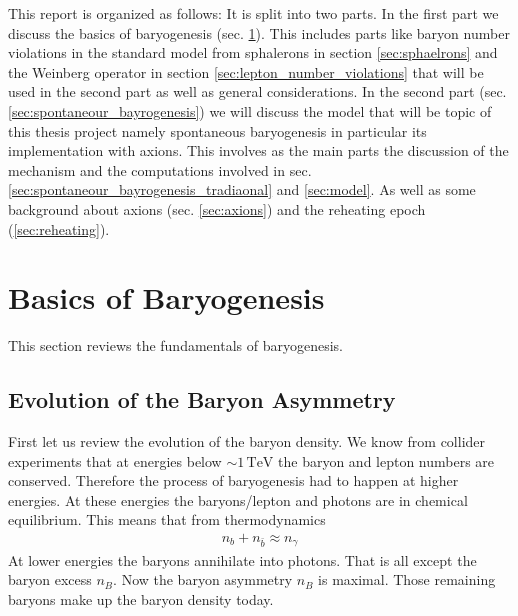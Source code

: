 \documentclass[13pt,a4paper,titlepage]{article}
\begin{document}
\noindent
This report is organized as follows: It is split into two parts.
In the first part we discuss the basics of baryogenesis (sec. \ref{sec:basics_of_baryogenesis}).
This includes parts like baryon number violations in the standard model from sphalerons in section
\ref{sec:sphaelrons} and the Weinberg operator in section \ref{sec:lepton_number_violations} that will
be used in the second part as well as general considerations.
In the second part (sec. \ref{sec:spontaneour_bayrogenesis}) we will discuss the model that will be topic of this
thesis project namely spontaneous baryogenesis in particular its implementation with axions.
This involves as the main parts the discussion of the mechanism and the computations involved in sec. \ref{sec:spontaneour_bayrogenesis_tradiaonal} and \ref{sec:model}.
As well as some background about axions (sec. \ref{sec:axions}) and the reheating epoch (\ref{sec:reheating}).

\section{Basics of Baryogenesis}
\label{sec:basics_of_baryogenesis}

This section reviews the fundamentals of baryogenesis.

\subsection{Evolution of the Baryon Asymmetry}
\label{sec:evolution_of_the_baryon_asymmetry}
First let us review the evolution of the baryon density. We know from collider experiments that at energies below $\sim 1 \, \mathrm{TeV}$ the baryon and lepton numbers are conserved.
Therefore the process of baryogenesis had to happen at higher energies.
At these energies the baryons/lepton and photons are in chemical equilibrium.
This means that from thermodynamics
\begin{align}
\label{eq:baryon_equilibrium}
n_b + n_{\bar{b}} \approx n_\gamma
\end{align}
At lower energies the baryons annihilate into photons. That is all except the baryon excess $n_B$. Now the baryon asymmetry $n_B$ is maximal. Those remaining baryons make up the baryon density today.
\end{document}
